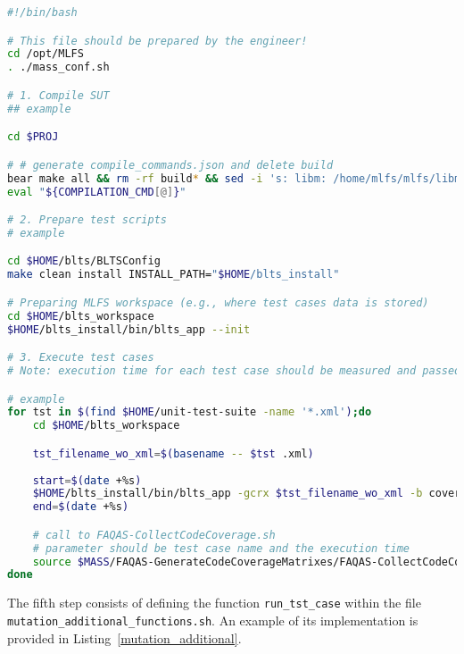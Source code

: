 \begin{lstlisting}[language=bash, label=preparesut_single, caption=PrepareSUT.sh file.]
#!/bin/bash

# This file should be prepared by the engineer!                                                                                           
cd /opt/MLFS
. ./mass_conf.sh

# 1. Compile SUT
## example

cd $PROJ

# # generate compile_commands.json and delete build
bear make all && rm -rf build* && sed -i 's: libm: /home/mlfs/mlfs/libm:' compile_commands.json && mv compile_commands.json $MUTANTS_DIR
eval "${COMPILATION_CMD[@]}"

# 2. Prepare test scripts
# example

cd $HOME/blts/BLTSConfig
make clean install INSTALL_PATH="$HOME/blts_install"

# Preparing MLFS workspace (e.g., where test cases data is stored)
cd $HOME/blts_workspace
$HOME/blts_install/bin/blts_app --init

# 3. Execute test cases
# Note: execution time for each test case should be measured and passed as argument to FAQAS-CollectCodeCoverage.sh

# example
for tst in $(find $HOME/unit-test-suite -name '*.xml');do
    cd $HOME/blts_workspace

    tst_filename_wo_xml=$(basename -- $tst .xml)
    
    start=$(date +%s)
    $HOME/blts_install/bin/blts_app -gcrx $tst_filename_wo_xml -b coverage --nocsv -s $tst
    end=$(date +%s)    

    # call to FAQAS-CollectCodeCoverage.sh
    # parameter should be test case name and the execution time
    source $MASS/FAQAS-GenerateCodeCoverageMatrixes/FAQAS-CollectCodeCoverage.sh $tst_filename_wo_xml "$(($end-$start))" $PROJ_COV
done
\end{lstlisting}

The fifth step consists of defining the function \texttt{run\_tst\_case} within the file \\\texttt{mutation\_additional\_functions.sh}. An example of its implementation is provided in Listing~\ref{mutation_additional}.

